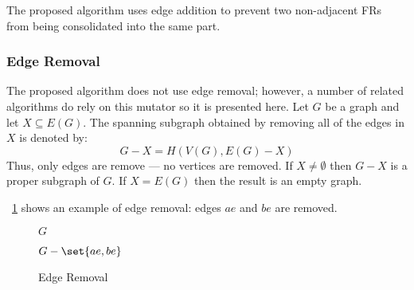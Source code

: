 The proposed algorithm uses edge addition to prevent two non-adjacent FRs from being consolidated into the same
part.

\subsubsection{Edge Removal}\label{sec:sub:sub:eremove}

The proposed algorithm does not use edge removal; however, a number of related algorithms do rely on this mutator
so it is presented here.  Let \(G\) be a graph and let \(X\subseteq E(G)\).  The spanning subgraph obtained by
removing all of the edges in \(X\) is denoted by:
\[G-X=H\left(V(G),E(G)-X\right)\]
Thus, only edges are remove --- no vertices are removed.  If \(X\ne\emptyset\) then \(G-X\) is a proper subgraph of
\(G\).  If \(X=E(G)\) then the result is an empty graph.

\figurename~\ref{fig:eremove} shows an example of edge removal: edges \(ae\) and \(be\) are removed.

\begin{figure}[H]
  \label{fig:eremove}
  \begin{minipage}{3in}
    \begin{center}

      \bigskip

      \(G\)
    \end{center}
  \end{minipage}
  \begin{minipage}{3in}
    \begin{center}

      \bigskip

      \(G-\set{ae,be}\)
    \end{center}
  \end{minipage}
  \caption{Edge Removal}
\end{figure}

